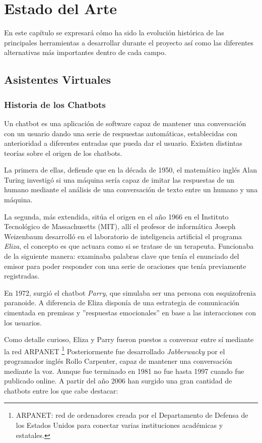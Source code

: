 \chapter{Estado del Arte}
En este capítulo se expresará cómo ha sido la evolución histórica de las principales herramientas a desarrollar durante el proyecto así como las diferentes alternativas más importantes dentro de cada campo.   

\section{Asistentes Virtuales}

\subsection{Historia de los Chatbots}

Un chatbot es una aplicación de software capaz de mantener una conversación con un usuario dando una serie de respuestas automáticas, establecidas con anterioridad a diferentes entradas que pueda dar el usuario. Existen distintas teorías sobre el origen de los chatbots. 

La primera de ellas, defiende que en la década de 1950, el matemático inglés Alan Turing investigó si una máquina sería capaz de imitar las respuestas de un humano mediante el análisis de una conversación de texto entre un humano y una máquina. 

La segunda, más extendida, sitúa el origen en el año 1966 en el Instituto Tecnológico de Massachusetts (MIT), allí el profesor de informática Joseph Weizenbaum desarrolló en el laboratorio de inteligencia artificial el programa \textit{Eliza}, el concepto es que actuara como si se tratase de un terapeuta. Funcionaba de la siguiente manera: examinaba palabras clave que tenía el enunciado del emisor para poder responder con una serie de oraciones que tenía previamente registradas.

En 1972, surgió el chatbot \textit{Parry}, que simulaba ser una persona con esquizofrenia paranoide. A diferencia de Eliza disponía de una estrategia de comunicación cimentada en premisas y ''respuestas emocionales'' en base a las interacciones con los usuarios. \cite{StreamGenerator}

Como detalle curioso, Eliza y Parry fueron puestos a conversar entre sí mediante la red ARPANET \footnote{ARPANET: red de ordenadores creada por el Departamento de Defensa de los Estados Unidos para conectar varias instituciones académicas y estatales.}  
Posteriormente fue desarrollado \textit{Jabberwacky} por el programador inglés Rollo Carpenter, capaz de mantener una conversación mediante la voz. Aunque fue terminado en 1981 no fue hasta 1997 cuando fue publicado online.
A partir del año 2006 han surgido una gran cantidad de chatbots entre los que cabe destacar:

